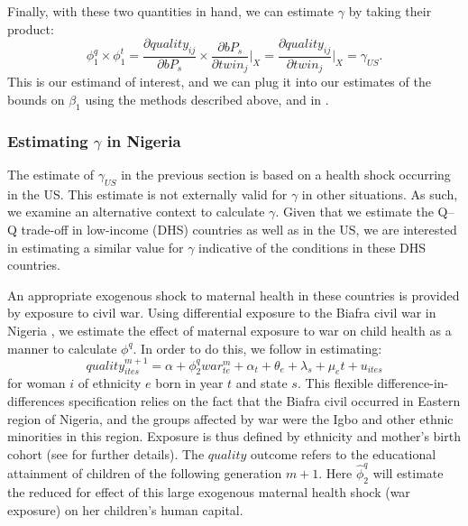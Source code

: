 \documentclass[subeqn]{article}
\begin{document}
\begin{spacing}{1.4}
Finally, with these two quantities in hand, we can estimate $\gamma$ by taking
their product:
\begin{equation}
  \label{TWINeqn:realgamma}
  \phi_1^q\times\phi_1^t=\frac{\partial quality_{ij}}{\partial bP_s}\times
  \frac{\partial bP_s}{\partial twin_j}\bigg|_{X}=
  \frac{\partial quality_{ij}}{\partial twin_j}\bigg|_{X}=\gamma_{US}.
\end{equation}
This is our estimand of interest, and we can plug it into our estimates of
the bounds on $\beta_1$ using the methods described above, and in
\citet{Conleyetal2012}.

\subsubsection{Estimating $\gamma$ in Nigeria}
\label{sscn:Nigeriagamma}
The estimate of $\gamma_{US}$ in the previous section is based on a health shock
occurring in the US.  This estimate is not externally valid for $\gamma$ in other
situations.  As such, we examine an alternative context to calculate $\gamma$.
Given that we estimate the Q--Q trade-off in low-income (DHS) countries as well
as in the US, we are interested in estimating a similar value for $\gamma$
indicative of the conditions in these DHS countries.

An appropriate exogenous shock to maternal health in these countries is provided
by exposure to civil war.  Using differential exposure to the Biafra civil war
in Nigeria \citep{Akreshetal2012}, we estimate the effect of maternal exposure to
war on child health as a manner to calculate $\phi^q$.  In order to do this, we
follow \citet{Akreshetal2012} in estimating:
\begin{equation}
  \label{TWINeqn:Nigeria}
  quality^{m+1}_{ites} = \alpha + \phi_2^q war^m_{te}+\alpha_t+\theta_e+\lambda_s+\mu_e t+u_{ites}
\end{equation}
for woman $i$ of ethnicity $e$ born in year $t$ and state $s$.  This flexible
difference-in-differences specification relies on the fact that the Biafra civil
occurred in Eastern region of Nigeria, and the groups affected by war were the
Igbo and other ethnic minorities in this region.  Exposure is thus defined by
ethnicity and mother's birth cohort (see \citet{Akreshetal2012} for further
details).  The $quality$ outcome refers to the educational attainment of children
of the following generation $m+1$.  Here $\hat\phi^q_2$ will estimate the reduced
for effect of this large exogenous maternal health shock (war exposure) on her
children's human capital.  


\end{spacing}
\end{document}
